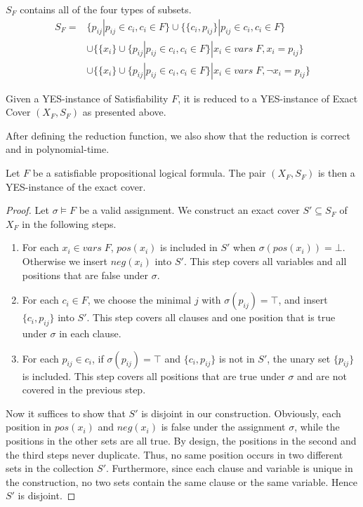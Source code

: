 $S_F$ contains all of the four types of subsets.
\begin{align*}
    S_F =& \{{p_{ij}} | p_{ij} \in c_i, c_i \in F \} 
    \cup \{\{c_i, p_{ij}\} | p_{ij} \in c_i, c_i \in F \} \\
    &\cup \{\{x_i\} \cup \{p_{ij} | p_{ij} \in c_i, c_i \in F\} | x_i \in vars\; F, x_i = p_{ij}\}\\
    &\cup \{\{x_i\} \cup \{p_{ij} | p_{ij} \in c_i, c_i \in F\} | x_i \in vars\; F, \neg x_i = p_{ij}\}
\end{align*}
\begin{definition}
    Given a YES-instance of Satisfiability $F$, 
    it is reduced to a YES-instance of Exact Cover $(X_F, S_F)$ as presented above.
\end{definition}
After defining the reduction function,
we also show that the reduction is correct and in polynomial-time.
\begin{lemma}[Soundness]
    \label{lemma:1}
    Let $F$ be a satisfiable propositional logical formula. The pair $(X_F, S_F)$ is then a YES-instance of the exact cover.
\end{lemma}
\begin{proof}
    Let $\sigma \models F$ be a valid assignment. We construct an exact cover $S' \subseteq S_F$ of $X_F$ in the following steps.
\begin{enumerate}
    \item For each $x_i \in vars\; F$, $pos(x_i)$ is included in $S'$ when $\sigma(pos(x_i)) = \bot$. Otherwise we insert $neg(x_i)$ into $S'$.
    This step covers all variables and all positions that are false under $\sigma$.
    \item For each $c_i \in F$, we choose the minimal $j$ with $\sigma(p_{ij}) = \top$, and insert $\{c_i, p_{ij}\}$ into $S'$.
    This step covers all clauses and one position that is true under $\sigma$ in each clause.
    \item For each $p_{ij} \in c_i$, if $\sigma(p_{ij}) = \top$ and $\{c_i, p_{ij}\}$ is not in $S'$, the unary set $\{p_{ij}\}$ is included. 
    This step covers all positions that are true under $\sigma$ and are not covered in the previous step.
\end{enumerate}
Now it suffices to show that $S'$ is disjoint in our construction.
Obviously, each position in $pos(x_i)$ and $neg(x_i)$ is false under the assignment $\sigma$, 
while the positions in the other sets are all true. By design, the positions in the second and the third steps never duplicate. 
Thus, no same position occurs in two different sets in the collection $S'$. 
Furthermore, since each clause and variable is unique in the construction, no two sets contain the same clause or the same variable.
Hence $S'$ is disjoint.
\end{proof}

